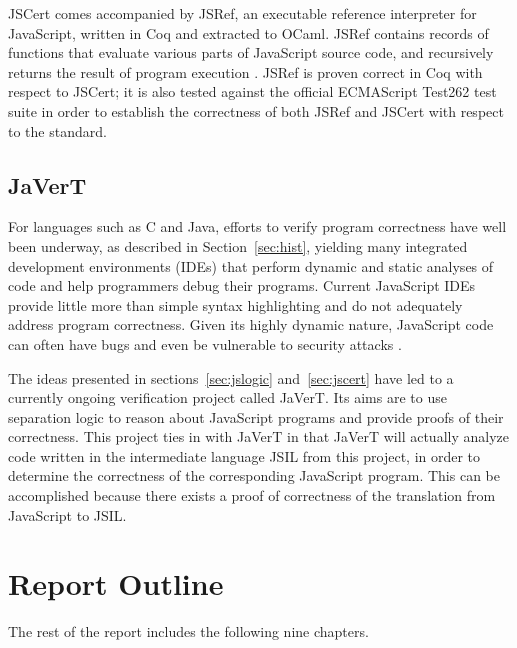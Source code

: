 \documentclass[a4paper,11pt,twoside]{report}
\begin{document}

JSCert comes accompanied by JSRef, an executable reference interpreter for JavaScript, written in Coq and extracted to OCaml. JSRef contains records of functions that evaluate various parts of JavaScript source code, and recursively returns the result of program execution \cite{Bodin:2014}. JSRef is proven correct in Coq with respect to JSCert; it is also tested against the official ECMAScript Test262 test suite in order to establish the correctness of both JSRef and JSCert with respect to the  standard.

\subsection{JaVerT}\label{sec:JaVerT}
For languages such as C and Java, efforts to verify program correctness have well been underway, as described in Section~\ref{sec:hist}, yielding many integrated development environments (IDEs) that perform dynamic and static analyses of code and help programmers debug their programs. Current JavaScript IDEs provide little more than simple syntax highlighting and do not adequately address program correctness. Given its highly dynamic nature, JavaScript code can often have bugs \cite{Gardner:2012} and even be vulnerable to security attacks \cite{Lee:2007}. 

The ideas presented in sections~\ref{sec:jslogic} and~\ref{sec:jscert} have led to a currently ongoing verification project called JaVerT. Its aims are to use separation logic to reason about JavaScript programs and provide proofs of their correctness. This project ties in with JaVerT in that JaVerT will actually analyze code written in the intermediate language JSIL from this project, in order to determine the correctness of the corresponding JavaScript program. This can be accomplished because there exists a proof of correctness of the translation from JavaScript to JSIL.

\section{Report Outline}
The rest of the report includes the following nine chapters.
\end{document}
